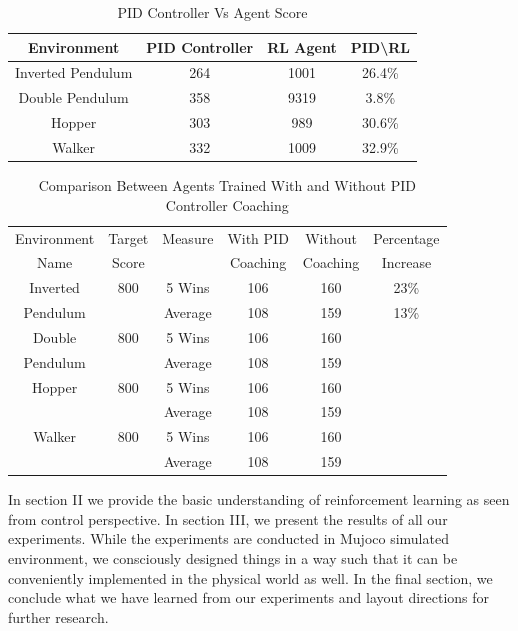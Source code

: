 \documentclass[journal]{IEEEtran}
\begin{document}
\begin{table}
\footnotesize
\caption{PID Controller Vs Agent Score}
\label{score}
\centering
\begin{tabular}{ |c|c|c|c| }
\hline
\cellcolor[HTML]{6195C9}Environment & \cellcolor[HTML]{6195C9}  PID Controller &\cellcolor[HTML]{6195C9}RL Agent &\cellcolor[HTML]{6195C9}PID\textbackslash RL \\
\hline
Inverted Pendulum &  264 & 1001& \cellcolor{lightgray}26.4\%\\
\hline
Double Pendulum &  358 & 9319&3.8\%\\
\hline
Hopper &  303 & 989&30.6\%\\
\hline
Walker &  332 & 1009&32.9\%\\
\hline
\end{tabular}
\end{table}


\begin{table}
\scriptsize

\caption{Comparison Between Agents Trained With and Without PID Controller Coaching}
\label{table_example}
\centering
\begin{tabular}{ |c|c||c|c|c|c| }
\hline
Environment & Target & Measure  &  With PID  & Without  & Percentage\\
   Name     & Score  &              & Coaching  & Coaching  & Increase \\
\hline
\hline


Inverted & 800& 5 Wins & 106 & 160& 23\% \\
Pendulum & &Average  & 108 &  159& 13\%\\
\hline
Double & 800& 5 Wins & 106 & 160\\
Pendulum & &Average & 108 &  159\\
\hline
Hopper & 800& 5 Wins & 106 & 160\\
       & &Average  & 108 &  159\\
\hline
Walker & 800& 5 Wins & 106 & 160\\
       & &Average  & 108 &  159\\
\hline

\end{tabular}
\end{table}




In section II we provide the basic understanding of reinforcement learning as seen from control perspective. In section III, we present the results of all our experiments. While the experiments are conducted in Mujoco simulated environment, we consciously designed things in a way such that it can be conveniently implemented in the physical world as well. In the final section, we conclude what we have learned from our experiments and layout directions for further research.
\end{document}
